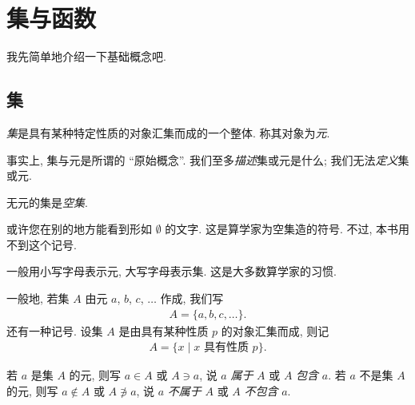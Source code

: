 \chapter{集与函数}

我先简单地介绍一下基础概念吧.

\section{集}

\begin{definition}
    \emph{集}是具有某种特定性质的对象汇集而成的一个整体. 称其对象为\emph{元}.
\end{definition}

\begin{remark}
    事实上, 集与元是所谓的 ``原始概念''. 我们至多\emph{描述}集或元是什么; 我们无法\emph{定义}集或元.
\end{remark}

\begin{definition}
    无元的集是\emph{空集}.
\end{definition}

\begin{remark}
    或许您在别的地方能看到形如 $\emptyset$ 的文字. 这是算学家为空集造的符号. 不过, 本书用不到这个记号.
\end{remark}

\begin{remark}
    一般用小写字母表示元, 大写字母表示集. 这是大多数算学家的习惯.
\end{remark}

\begin{definition}
    一般地, 若集 $A$ 由元 $a$, $b$, $c$, $\dots$ 作成, 我们写
    \begin{align*}
        A = \{ a,b,c,\dots \}.
    \end{align*}
    还有一种记号. 设集 $A$ 是由具有某种性质 $p$ 的对象汇集而成, 则记
    \begin{align*}
        A = \{ x \mid \text{$x$ 具有性质 $p$} \}.
    \end{align*}
\end{definition}

\begin{definition}
    若 $a$ 是集 $A$ 的元, 则写 $a \in A$ 或 $A \ni a$, 说 $a$ \emph{属于} $A$ 或 $A$ \emph{包含} $a$. 若 $a$ 不是集 $A$ 的元, 则写 $a \notin A$ 或 $A \not\ni a$, 说 $a$ \emph{不属于} $A$ 或 $A$ \emph{不包含} $a$.
\end{definition}

